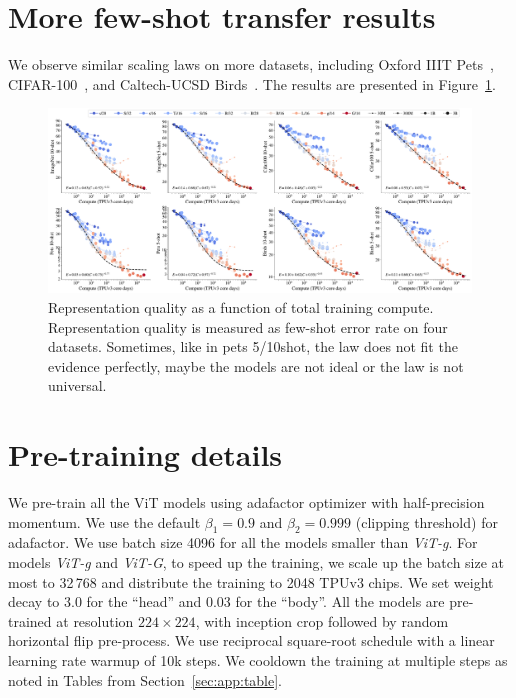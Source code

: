 \appendix

\section{More few-shot transfer results}\label{sec:app:more_results}

We observe similar scaling laws on more datasets, including Oxford IIIT Pets~\cite{pets}, CIFAR-100~\cite{cifar}, and Caltech-UCSD Birds~\cite{cub}. The results are presented in Figure~\ref{fig:scaling_laws_all_results}.

\begin{figure}[h]
  \begin{center}
    \includegraphics[width=\linewidth]{figs/scaling_laws_all.pdf}
  \end{center}
  \caption{Representation quality as a function of total training compute. Representation quality is measured as few-shot error rate on four datasets. 
  Sometimes, like in pets 5/10shot, the law does not fit the evidence perfectly, maybe the models are not ideal or the law is not universal.
  }
  \label{fig:scaling_laws_all_results}
\end{figure}


\section{Pre-training details}\label{sec:app:adaptation_details}
We pre-train all the ViT models using adafactor optimizer with half-precision momentum. 
We use the default $\beta_1=0.9$ and $\beta_2=0.999$ (clipping threshold) for adafactor.
We use batch size 4096 for all the models smaller than \emph{ViT-g}.
For models \emph{ViT-g} and \emph{ViT-G}, to speed up the training, we scale up the batch size at most to 32\,768 and distribute the training to 2048 TPUv3 chips.
We set weight decay to 3.0 for the ``head'' and 0.03 for the ``body''.
All the models are pre-trained at resolution $224\times224$, with inception crop followed by random horizontal flip pre-process.
We use reciprocal square-root schedule with a linear learning rate warmup of 10k steps.
We cooldown the training at multiple steps as noted in Tables from Section~\ref{sec:app:table}.


